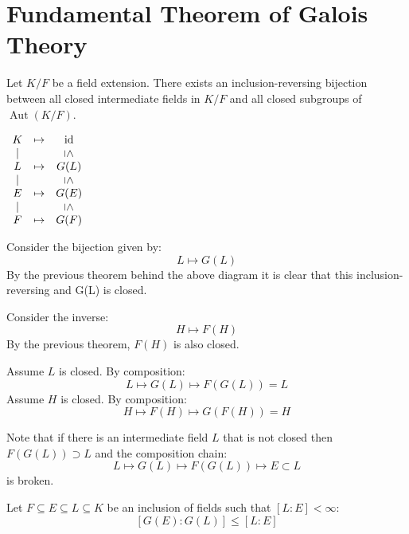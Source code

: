 \documentclass[letterpaper,12pt,fleqn]{article}
\DeclareMathOperator{\Aut}{Aut}
\DeclareMathOperator{\id}{id}
\begin{document}
\section*{Fundamental Theorem of Galois Theory}

\begin{theorem}
  Let $K/F$ be a field extension. There exists an inclusion-reversing
  bijection between all closed intermediate fields in $K/F$ and all closed
  subgroups of $\Aut(K/F)$.
\end{theorem}

$\begin{array}{ccc}
  K & \mapsto & \id \\
  | & & \rotatebox[origin=c]{-90}{$\le$} \\
  L & \mapsto & G(L) \\
  | & & \rotatebox[origin=c]{-90}{$\le$} \\
  E & \mapsto & G(E) \\
  | & & \rotatebox[origin=c]{-90}{$\le$} \\
  F & \mapsto & G(F)
\end{array}$

\begin{theproof}
  Consider the bijection given by:
  \[L\mapsto G(L)\]
  By the previous theorem behind the above diagram it is clear that this
  inclusion-reversing and G(L) is closed.

  Consider the inverse:
  \[H\mapsto F(H)\]
  By the previous theorem, $F(H)$ is also closed.

  Assume $L$ is closed. By composition:
  \[L\mapsto G(L) \mapsto F(G(L))=L\]
  Assume $H$ is closed. By composition:
  \[H\mapsto F(H)\mapsto G(F(H))=H\]
\end{theproof}

Note that if there is an intermediate field $L$ that is not closed then
$F(G(L))\supset L$ and the composition chain:
\[L\mapsto G(L)\mapsto F(G(L))\mapsto E\subset L\]
is broken.

\begin{theorem}
  Let $F\subseteq E\subseteq L\subseteq K$ be an inclusion of fields such that
  $[L:E]<\infty$:
  \[[G(E):G(L)]\le[L:E]\]
\end{theorem}
\end{document}
